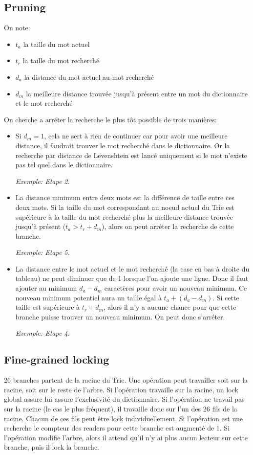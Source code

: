 \documentclass{article}
\begin{document}
\subsection{Pruning}
On note:
\begin{itemize}
\item $t_a$ la taille du mot actuel
\item $t_r$ la taille du mot recherché
\item $d_a$ la distance du mot actuel au mot recherché
\item $d_m$ la meilleure distance trouvée jusqu'à présent entre un mot du dictionnaire et le mot recherché
\end{itemize}
On cherche a arréter la recherche le plus tôt possible de trois manières:
\begin{itemize}
\item Si $d_m = 1$, cela ne sert à rien de continuer car pour avoir une meilleure distance, il faudrait trouver le mot recherché dans le dictionnaire. Or la recherche par distance de Levenshtein est lancé uniquement si le mot n'existe pas tel quel dans le dictionnaire.

\textit{Exemple: Etape 2.}

\item La distance minimum entre deux mots est la différence de taille
  entre ces deux mots.
Si la taille du mot correspondant au noeud actuel du Trie est supérieure
à la taille du mot recherché plus la meilleure distance trouvée jusqu'à
présent ($t_a > t_r + d_m$), alors on peut arréter la recherche de cette branche.

\textit{Exemple: Etape 5.}

\item La distance entre le mot actuel et le mot recherché (la case en
  bas à droite du tableau) ne peut diminuer que de 1 lorsque l'on ajoute
  une ligne.
Donc il faut ajouter au minimum $d_a - d_m$ caractères pour avoir un nouveau minimum.
Ce nouveau minimum potentiel aura un taille égal à $t_a + (d_a - d_m)$.
Si cette taille est supérieure à $t_r + d_m$,
alors il n'y a aucune chance pour que cette branche puisse trouver un
nouveau minimum.
On peut donc s'arréter.

\textit{Exemple: Etape 4.}
\end{itemize}

\subsection{Fine-grained locking}
26 branches partent de la racine du Trie.
Une opération peut travailler soit sur la racine, soit sur le reste de
l'arbre.
Si l'opération travaille sur la racine, un lock global assure lui assure
l'exclusivité du dictionnaire.
Si l'opération ne travail pas sur la racine (le cas le plus fréquent),
il travaille donc sur l'un des 26 fils de la racine.
Chacun de ces fils peut être lock individuellement.
Si l'opération est une recherche le compteur des readers pour cette
branche est augmenté de 1.
Si l'opération modifie l'arbre, alors il attend qu'il n'y ai plus aucun
lecteur sur cette branche, puis il lock la branche.
\end{document}
